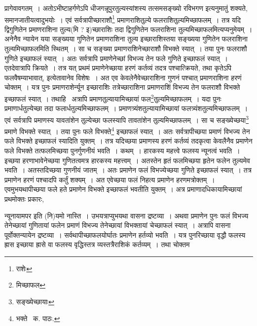 \documentclass[11pt, openany]{book}
\begin{document}
\noindent प्रागेवावगतम्~। अतोऽभीष्टाहर्गणेऽपि धीजगन्नूपुरतुल्यस्यांशस्य तत्समसङ्ख्यो रविभगण इत्यनुमातुं शक्यते, समानजातीयत्वादुभयोः~। एवं सर्वत्रापीच्छाराशौ\renewcommand{\thefootnote}{१}\footnote{राशेः} प्रमाणराशितुल्ये फलराशितुल्यमिच्छाफलम्~। तत्र यदि द्विगुणितेन प्रमाणराशिना तुल्य(मि ? इ)च्छाराशिः तदा द्विगुणितेन फलराशिना तुल्यमिच्छाफलमित्यप्यनुमेयम्~। अनेनैव न्यायेन यया सङ्ख्यया गुणितेन प्रमाणराशिना तुल्य इच्छाराशिस्तया सङ्ख्यया गुणितेन फलराशिना तुल्यमिच्छाफलमिति स्थितम्~। सा च सङ्ख्या प्रमाणराशिनेच्छाराशौ विभक्ते स्यात्~। तया पुनः फलराशौ गुणिते इच्छाफलं स्यात्~। अतः सर्वत्रापि प्रमाणेनेच्छां विभज्य तेन फले गुणिते इच्छाफलं स्यात्~। एतदेवात्रापि क्रियते~। तत्र यत् प्रथमं प्रमाणेनेच्छाया हरणं कर्तव्यं तदत्र पश्चात्क्रियते, तथा कृतेऽपि फलवैषम्याभावात्, इत्येतावानेव विशेषः~। अत एव केवलेनैवेच्छाराशिना गुणनं पश्चात् प्रमाणराशिना हरणं चोक्तम्~। यत्र पुनः प्रमाणराशेर्न्यून इच्छाराशिः तत्रेच्छाराशिना प्रमाणराशिं विभज्य तेन फलराशौ विभक्ते इच्छाफलं स्यात्~। तथाहि \textendash\ अत्रापि प्रमाणतुल्यायामिच्छायां फल\renewcommand{\thefootnote}{२}\footnote{मिच्छाफल}तुल्यमिच्छाफलम्~। यदा पुनः प्रमाणार्धतुल्येच्छा तदा फलार्धतुल्यमिच्छाफलम्~। प्रमाणत्र्यंशतुल्यायामिच्छायां फलत्र्यंशतुल्यमिच्छाफलम्~। एवं सर्वत्रापि प्रमाणस्य यावतांशेन तुल्येच्छा फलस्यापि तावतांशेन तुल्यमिच्छाफलम्~। सा च सङ्ख्येच्छया\renewcommand{\thefootnote}{३}\footnote{सङ्ख्येच्छायाः} प्रमाणे विभक्ते स्यात्~। तया पुनः फले विभक्ते\renewcommand{\thefootnote}{४}\footnote{भक्ते \textendash\ क. पाठः.} इच्छाफलं स्यात्~। अतः सर्वत्रापीच्छया प्रमाणं विभज्य तेन फले विभक्ते इच्छाफलं स्यादिति युक्तम्~। तत्र यदिच्छया प्रमाणस्य हरणं कर्तव्यं तदकृत्वा केवलैनैव प्रमाणेन फले विभक्ते तत्फलमिच्छया पुनर्गुणनीयं भवति~। कथम्~। हारकस्य महत्त्वे फलस्य न्यूनत्वं भवति~। इच्छया हरणाभावेनेच्छया गुणितत्वमत्र हारकस्य महत्त्वम्~। अतस्तेन हृतं फलमिच्छया हृतेन फलेन तुल्यमेव भवति~। अतस्तदिच्छया गुणनीयं जातम्~। अतः प्रमाणेन फलं विभज्येच्छया गुणिते इच्छाफलं स्यात्~। तत्र प्रमाणेन हरणं पश्चादपि कर्तुं शक्यम्~। अत एवेच्छया फलं निहत्य प्रमाणेन हरणमत्रोक्तम्~। एवमुभयथापीच्छया फले हते प्रमाणेन विभक्ते इच्छाफलं भवतीति युक्तम्~। अत्र प्रमाणादधिकायामिच्छायां प्रथमोक्तः प्रकारः,

\newpage

\noindent न्यूनायामपर इति (नि)यमो नास्ति~। उभयत्राप्युभयथा वासना द्रष्टव्या~। अथवा प्रमाणेन पुनः फलं विभज्य तेनेच्छायां गुणितायां फलेन प्रमाणं विभज्य तेनेच्छायां विभक्तायां चेच्छाफलं स्यात्~। अत्रापि वासना पूर्वोक्तन्यायेन द्रष्टव्या~। सर्वथापीच्छाफलयोर्घातः प्रमाणेन हर्तव्यो भवति~। यत्र पुनरिच्छाया वृद्धौ फलस्य ह्रास इच्छाया ह्रासे वा फलस्य वृद्धिस्तत्र व्यस्तत्रैराशिकं कर्तव्यम्~। तथा चोक्तम\textendash 
\end{document}
